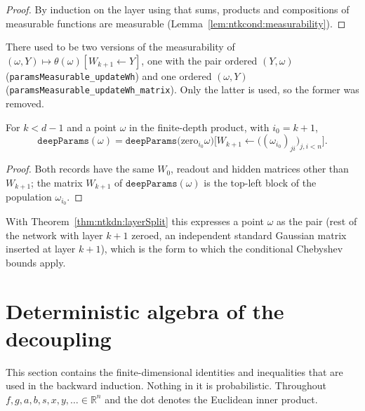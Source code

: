 \begin{proof}
  \leanok
By induction on the layer using that sums, products and compositions of measurable functions are measurable (Lemma~\ref{lem:ntkcond:measurability}).
\end{proof}

\begin{remark}\label{rmk:ntkdn:measurableChange}
There used to be two versions of the measurability of $(\omega,Y)\mapsto\theta(\omega)[W_{k+1}\leftarrow Y]$, one with the pair ordered $(Y,\omega)$ (\texttt{paramsMeasurable\_updateWh}) and one ordered $(\omega,Y)$ (\texttt{paramsMeasurable\_updateWh\_matrix}). Only the latter is used, so the former was removed.
\end{remark}


\begin{lemma}\label{lem:ntkdn:layerSubstitution}
  \leanok
For $k<d-1$ and a point $\omega$ in the finite-depth product, with $i_0=k+1$,
\[
  \texttt{deepParams}(\omega)=\texttt{deepParams}\bigl(\mathrm{zero}_{i_0}\omega\bigr)
  \bigl[W_{k+1}\leftarrow\bigl((\omega_{i_0})_{ji}\bigr)_{j,i<n}\bigr].
\]
\end{lemma}

\begin{proof}
  \leanok
Both records have the same $W_0$, readout and hidden matrices other than $W_{k+1}$; the matrix $W_{k+1}$ of $\texttt{deepParams}(\omega)$ is the top-left block of the population $\omega_{i_0}$.
\end{proof}

With Theorem~\ref{thm:ntkdn:layerSplit} this expresses a point $\omega$ as the pair (rest of the network with layer $k+1$ zeroed, an independent standard Gaussian matrix inserted at layer $k+1$), which is the form to which the conditional Chebyshev bounds apply.


\section{Deterministic algebra of the decoupling}\label{sec:ntkdn:algebra}

This section contains the finite-dimensional identities and inequalities that are used in the backward induction. Nothing in it is probabilistic. Throughout $f,g,a,b,s,x,y,\dots\in\mathbb R^n$ and the dot denotes the Euclidean inner product.

